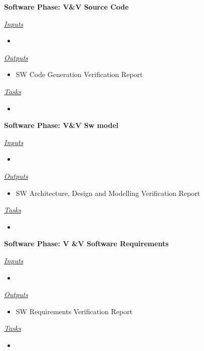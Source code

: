 \documentclass{template/openetcs_article}
\begin{document}
\begin{description}
\item \textbf{Software Phase: V\&V Source Code}

\underline{\textit{Inputs}}
\begin{itemize}
\item 
\end{itemize}

\underline{\textit{Outputs}}
\begin{itemize}
\item SW Code Generation Verification Report
\end{itemize}

\underline{\textit{Tasks}}
\begin{itemize}
\item 
\end{itemize}
\end{description}

\begin{description}
\item \textbf{Software Phase: V\&V Sw model}

\underline{\textit{Inputs}}
\begin{itemize}
\item 
\end{itemize}

\underline{\textit{Outputs}}
\begin{itemize}
\item SW Architecture, Design and Modelling Verification Report
\end{itemize}

\underline{\textit{Tasks}}
\begin{itemize}
\item 
\end{itemize}
\end{description}

\begin{description}
\item \textbf{Software Phase: V \&V Software Requirements}

\underline{\textit{Inputs}}
\begin{itemize}
\item 
\end{itemize}

\underline{\textit{Outputs}}
\begin{itemize}
\item SW Requirements Verification Report
\end{itemize}

\underline{\textit{Tasks}}
\begin{itemize}
\item 
\end{itemize}
\end{description}
\end{document}
